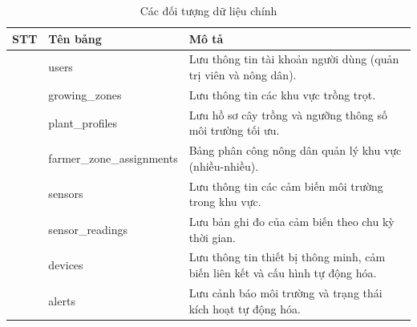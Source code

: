 \documentclass[13pt,a4paper]{extarticle}
\numberwithin{figure}{section}
\numberwithin{table}{section}
\begin{document}
	\begin{table}[H]
		\centering
		\caption{Các đối tượng dữ liệu chính}
		\label{tab:doi-tuong}
		\begingroup
		\setlength{\tabcolsep}{4pt}
		\begin{tabularx}{\textwidth}{|>{\centering\arraybackslash}p{1cm}|>{\raggedright\arraybackslash}p{4cm}|Y|}
			\hline
			\centering\textbf{STT} & \centering\textbf{Tên bảng} & \centering\arraybackslash\textbf{Mô tả} \\
			 & users & Lưu thông tin tài khoản người dùng (quản trị viên và nông dân). \\
			 & growing\_zones & Lưu thông tin các khu vực trồng trọt. \\
			 & plant\_profiles & Lưu hồ sơ cây trồng và ngưỡng thông số môi trường tối ưu. \\
			 & farmer\_zone\_assignments & Bảng phân công nông dân quản lý khu vực (nhiều-nhiều). \\
			 & sensors & Lưu thông tin các cảm biến môi trường trong khu vực. \\
			 & sensor\_readings & Lưu bản ghi đo của cảm biến theo chu kỳ thời gian. \\
			 & devices & Lưu thông tin thiết bị thông minh, cảm biến liên kết và cấu hình tự động hóa. \\
			 & alerts & Lưu cảnh báo môi trường và trạng thái kích hoạt tự động hóa. \\
			\hline
		\end{tabularx}
		\endgroup
	\end{table}
	
\end{document}

